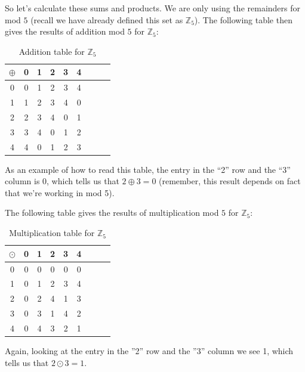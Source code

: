 So let's calculate these sums and products.  We are only using the remainders for mod $5$ (recall we have already defined this set as  ${\mathbb Z}_{5}$).
The following table then gives the results of addition mod $5$ for ${\mathbb Z}_{5}$:

\begin{table}[h]
\caption{\label{groups_Z5_add_table}Addition table for ${\mathbb Z}_5$}{\small
\begin{center}
\begin{tabular}{c|cccccccc}
$\oplus$ & 0 & 1 & 2 & 3 & 4 \\
\hline
0        & 0 & 1 & 2 & 3 & 4 \\
1       & 1 & 2 & 3 & 4 & 0 \\
2       & 2 & 3 & 4 & 0 & 1\\
3       & 3 & 4 & 0 & 1 & 2\\
4       & 4 & 0 & 1 & 2 & 3\\

\end{tabular}
\end{center}
}
\end{table}

\noindent
As an example of how to read this table, the entry in the ``2'' row and the ``3'' column is 0, which tells us that $2 \oplus 3 = 0$ 
(remember, this result depends on fact that we're working in mod 5).

The following table gives the results of multiplication mod $5$ for ${\mathbb Z}_{5}$:

\begin{table}[h]
\caption{\label{groups_Z5_mult_table} Multiplication table for ${\mathbb Z}_5$}
{\small
\begin{center}
\begin{tabular}{c|cccccccc}
$\odot$ & 0 & 1 & 2 & 3 & 4 \\
\hline
0       & 0 & 0 & 0 & 0 & 0 \\
1       & 0 & 1 & 2 & 3 & 4  \\
2       & 0 & 2 & 4 & 1 & 3  \\
3       & 0 & 3 & 1 & 4 & 2  \\
4       & 0 & 4 & 3 & 2 & 1  \\

\end{tabular}
\end{center}
}
\end{table}

\noindent
Again, looking at the entry in the ''2'' row and the ''3'' column we see 1, which tells us that $2 \odot 3 = 1$.

